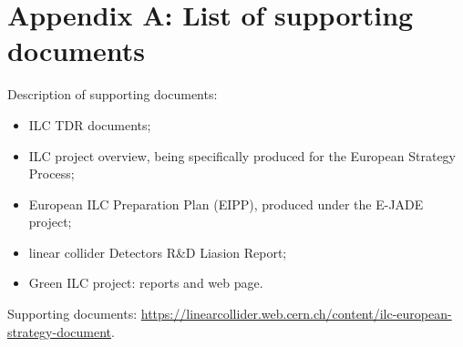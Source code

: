 \documentclass[%
 reprint,
 floatfix,
 amsmath,amssymb,
 aps,
]{revtex4-1}
\begin{document}
\appendix


\section*{\label{Appendix3} \Large{Appendix A: List of supporting documents} }
Description of supporting documents:
\begin{itemize}
\item
ILC TDR documents;
\item
ILC project overview, being specifically produced for the European Strategy Process;
\item
European ILC Preparation Plan (EIPP), produced under the E-JADE project;
\item
linear collider Detectors R\&D Liasion Report;
\item
Green ILC project: reports and web page.

\end{itemize}

Supporting documents: \url{https://linearcollider.web.cern.ch/content/ilc-european-strategy-document}.
\end{document}
